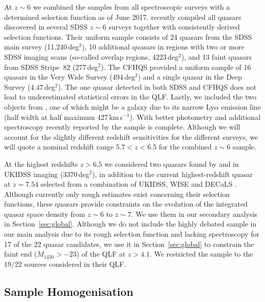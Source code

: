 \documentclass[fleqn,usenatbib]{mnras}
\begin{document}
At $z\sim 6$ we combined the samples from all spectroscopic surveys
with a determined selection function as of June 2017.
\citet{2016ApJ...833..222J} recently compiled all quasars discovered
in several SDSS $z\sim 6$ surveys together with consistently derived
selection functions. Their uniform sample consists of 24 quasars from
the SDSS main survey (11,240\,deg$^2$), 10 additional quasars in
regions with two or more SDSS imaging scans (so-called overlap
regions, 4223\,deg$^2$), and 13 faint quasars from SDSS Stripe~82
(277\,deg$^2$). The CFHQS \citep{2010AJ....139..906W} provided a
uniform sample of 16 quasars in the Very Wide Survey (494\,deg$^2$)
and a single quasar in the Deep Survey ($4.47$\,deg$^2$). The one
quasar detected in both SDSS and CFHQS does not lead to underestimated
statistical errors in the QLF. Lastly, we included the two objects
from \citet{2015ApJ...798...28K}, one of which might be a galaxy due
to its narrow Ly$\alpha$ emission line (half width at half maximum
427\,km\,s$^{-1}$). With better photometry and additional spectroscopy
recently reported by \citet{2017ApJ...847L..15O} the
\citet{2015ApJ...798...28K} sample is complete.  Although we will
account for the slightly different redshift sensitivities for the
different surveys, we will quote a nominal redshift range $5.7<z<6.5$
for the combined $z\sim 6$ sample.

At the highest redshifts $z>6.5$ we considered two quasars found by
\citet{2011Natur.474..616M} and \citet{2015ApJ...801L..11V} in UKIDSS
imaging (3370\,deg$^2$), in addition to the current highest-redshift
quasar at $z=7.54$ selected from a combination of UKIDSS, WISE and
DECaLS \citep[$\sim 2500$\,deg$^2$, ][]{2018Natur.553..473B}. Although
currently only rough estimates exist concerning their selection
functions, these quasars provide constraints on the evolution of the
integrated quasar space density from $z\sim 6$ to $z\sim 7$.  We use
them in our secondary analysis in Section~\ref{sec:global}.  Although
we do not include the highly debated \citet{2015AA...578A..83G} sample
in our main analysis due to its rough selection function and lacking
spectroscopy for 17 of the 22 quasar candidates, we use it in
Section~\ref{sec:global} to constrain the faint end ($M_{1450}>-23$)
of the QLF at $z>4.1$. We restricted the \citet{2015AA...578A..83G}
sample to the 19/22 sources considered in their QLF.

\subsection{Sample Homogenisation}
\label{sect:datahom}
\end{document}
